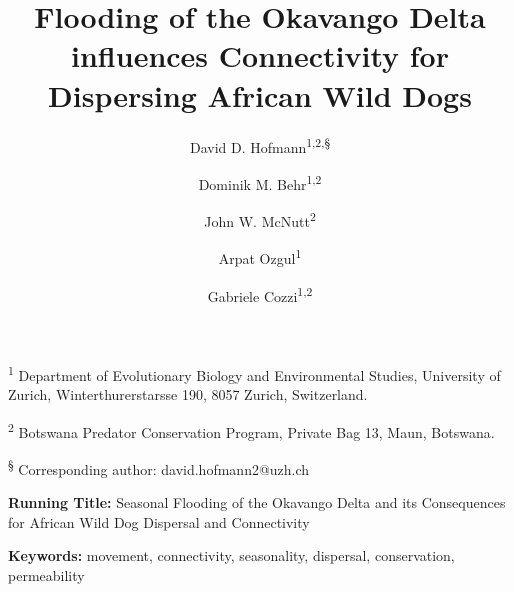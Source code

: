 \documentclass[abstract=on,10pt,a4paper,bibliography=totocnumbered]{article}
\title{Flooding of the Okavango Delta influences Connectivity for Dispersing
African Wild Dogs}
\author{
  David D. Hofmann\textsuperscript{1,2,\S} \orcid{0000-0003-3477-4365} \and
  Dominik M. Behr\textsuperscript{1,2} \orcid{0000-0001-7378-8538} \and
  John W. McNutt\textsuperscript{2} \and
  Arpat Ozgul\textsuperscript{1} \orcid{0000-0001-7477-2642} \and
  Gabriele Cozzi\textsuperscript{1,2} \orcid{0000-0002-1744-1940}
}
\begin{document}



\maketitle

\begin{flushleft}

\vspace{0.5cm}

\textsuperscript{1} Department of Evolutionary Biology and Environmental
Studies, University of Zurich, Winterthurerstarsse 190, 8057 Zurich,
Switzerland.

\textsuperscript{2} Botswana Predator Conservation Program, Private Bag 13,
Maun, Botswana.

\textsuperscript{\S} Corresponding author: david.hofmann2@uzh.ch

\vspace{4cm}

\textbf{Running Title:} Seasonal Flooding of the Okavango Delta and its
Consequences for African Wild Dog Dispersal and Connectivity

\vspace{0.5cm}

\textbf{Keywords:} movement, connectivity, seasonality, dispersal, conservation,
permeability

\end{flushleft}
\end{document}
